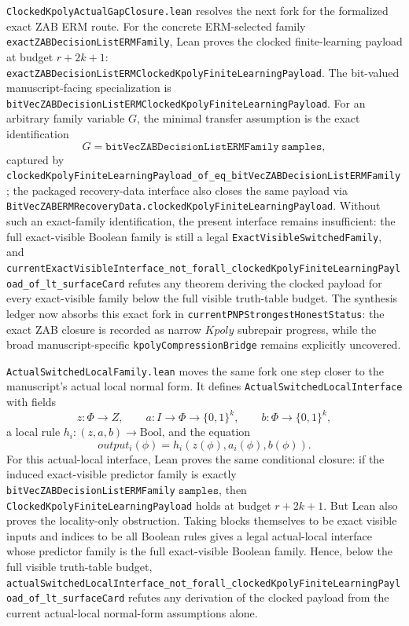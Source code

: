 \documentclass[11pt]{article}
\theoremstyle{remark}
\begin{document}
\texttt{ClockedKpolyActualGapClosure.lean} resolves the next fork for the
formalized exact ZAB ERM route.  For the concrete ERM-selected family
\texttt{exactZABDecisionListERMFamily}, Lean proves the clocked finite-learning
payload at budget \(r+2k+1\):
\texttt{exactZABDecisionListERMClockedKpolyFiniteLearningPayload}.  The
bit-valued manuscript-facing specialization is
\texttt{bitVecZABDecisionListERMClockedKpolyFiniteLearningPayload}.  For an
arbitrary family variable \(G\), the minimal transfer assumption is the exact
identification
\[
  G =
  \texttt{bitVecZABDecisionListERMFamily}\ \texttt{samples},
\]
captured by
\texttt{clockedKpolyFiniteLearningPayload\_of\_eq\_bitVecZABDecisionListERMFamily};
the packaged recovery-data interface also closes the same payload via
\texttt{BitVecZABERMRecoveryData.clockedKpolyFiniteLearningPayload}.  Without
such an exact-family identification, the present interface remains
insufficient: the full exact-visible Boolean family is still a legal
\texttt{ExactVisibleSwitchedFamily}, and
\texttt{currentExactVisibleInterface\_not\_forall\_clockedKpolyFiniteLearningPayload\_of\_lt\_surfaceCard}
refutes any theorem deriving the clocked payload for every exact-visible
family below the full visible truth-table budget.  The synthesis ledger now
absorbs this exact fork in
\texttt{currentPNPStrongestHonestStatus}: the exact ZAB closure is recorded as
narrow \(Kpoly\) subrepair progress, while the broad manuscript-specific
\texttt{kpolyCompressionBridge} remains explicitly uncovered.

\texttt{ActualSwitchedLocalFamily.lean} moves the same fork one step closer to
the manuscript's actual local normal form.  It defines
\texttt{ActualSwitchedLocalInterface} with fields
\[
  z : \Phi \to Z,\qquad
  a : I \to \Phi \to \{0,1\}^k,\qquad
  b : \Phi \to \{0,1\}^k,
\]
a local rule \(h_i : (z,a,b)\to\mathrm{Bool}\), and the equation
\[
  output_i(\phi)=h_i(z(\phi),a_i(\phi),b(\phi)).
\]
For this actual-local interface, Lean proves the same conditional closure:
if the induced exact-visible predictor family is exactly
\texttt{bitVecZABDecisionListERMFamily}\(\;\texttt{samples}\), then
\texttt{ClockedKpolyFiniteLearningPayload} holds at budget \(r+2k+1\).
But Lean also proves the locality-only obstruction.  Taking blocks themselves
to be exact visible inputs and indices to be all Boolean rules gives a legal
actual-local interface whose predictor family is the full exact-visible
Boolean family.  Hence, below the full visible truth-table budget,
\texttt{actualSwitchedLocalInterface\_not\_forall\_clockedKpolyFiniteLearningPayload\_of\_lt\_surfaceCard}
refutes any derivation of the clocked payload from the current actual-local
normal-form assumptions alone.
\end{document}
